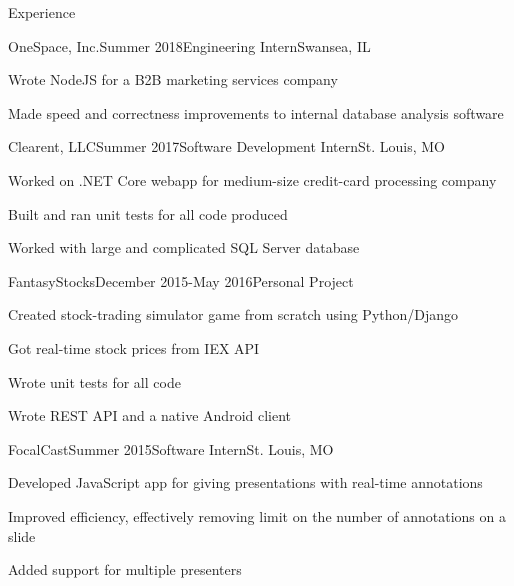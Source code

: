\documentclass{resume} %
\begin{document}
            \begin{rSection}{Experience}
                \begin{rSubsection}{OneSpace, Inc.}{Summer 2018}{Engineering Intern}{Swansea, IL}
                    \item Wrote NodeJS for a B2B marketing services company
                    \item Made speed and correctness improvements to internal database analysis software
                \end{rSubsection}


                \begin{rSubsection}{Clearent, LLC}{Summer 2017}{Software Development Intern}{St. Louis, MO}
                    \item Worked on .NET Core webapp for medium-size credit-card processing company
                    \item Built and ran unit tests for all code produced
                    \item Worked with large and complicated SQL Server database
                \end{rSubsection}

                \begin{rSubsection}{FantasyStocks}{December 2015-May 2016}{Personal Project}{}
                 \item Created stock-trading simulator game from scratch using Python/Django
                 \item Got real-time stock prices from IEX API
                 \item Wrote unit tests for all code
                 \item Wrote REST API and a native Android client
                \end{rSubsection}


                \begin{rSubsection}{FocalCast}{Summer 2015}{Software Intern}{St. Louis, MO}{}
                    \item Developed JavaScript app for giving presentations with real-time annotations
                    \item Improved efficiency, effectively removing limit on the number of annotations on a slide
                    \item Added support for multiple presenters
                \end{rSubsection}

            \end{rSection}
\end{document}
